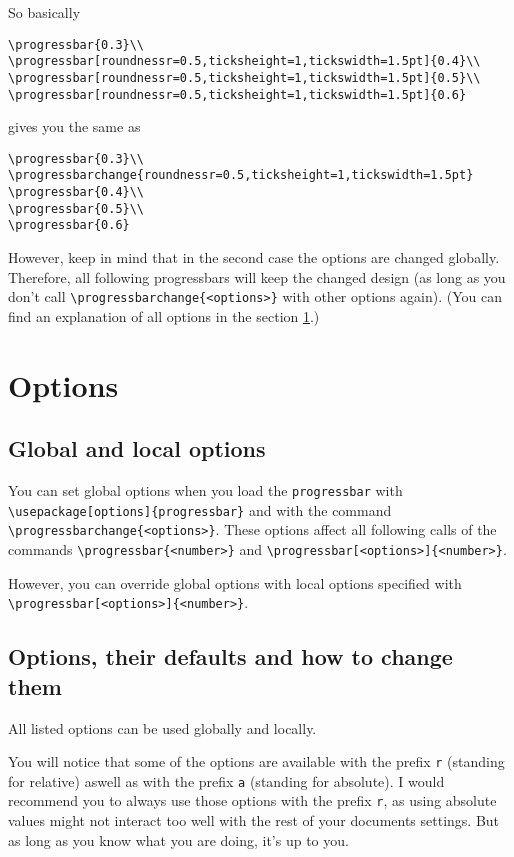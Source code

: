 \documentclass{ltxdoc}
\begin{document}
So basically
\begin{lstlisting}
\progressbar{0.3}\\
\progressbar[roundnessr=0.5,ticksheight=1,tickswidth=1.5pt]{0.4}\\
\progressbar[roundnessr=0.5,ticksheight=1,tickswidth=1.5pt]{0.5}\\
\progressbar[roundnessr=0.5,ticksheight=1,tickswidth=1.5pt]{0.6}
\end{lstlisting}
gives you the same as
\begin{lstlisting}
\progressbar{0.3}\\
\progressbarchange{roundnessr=0.5,ticksheight=1,tickswidth=1.5pt}
\progressbar{0.4}\\
\progressbar{0.5}\\
\progressbar{0.6}
\end{lstlisting}

However, keep in mind that in the second case the options are changed globally. Therefore, all following progressbars will keep the changed design (as long as you don't call \lstinline+\progressbarchange{<options>}+ with other options again). (You can find an explanation of all options in the section \ref{options}.)

\section{Options}\label{options}
\subsection{Global and local options}
You can set global options when you load the \texttt{progressbar} with \lstinline+\usepackage[options]{progressbar}+ and with the command \lstinline+\progressbarchange{<options>}+. These options affect all following calls of the commands \lstinline+\progressbar{<number>}+ and \lstinline+\progressbar[<options>]{<number>}+.

However, you can override global options with local options specified with \lstinline+\progressbar[<options>]{<number>}+.

\subsection{Options, their defaults and how to change them}
All listed options can be used globally and locally.

You will notice that some of the options are available with the prefix \texttt{r} (standing for relative) aswell as with the prefix \texttt{a} (standing for absolute). I would recommend you to always use those options with the prefix \texttt{r}, as using absolute values might not interact too well with the rest of your documents settings. But as long as you know what you are doing, it's up to you.
\end{document}
